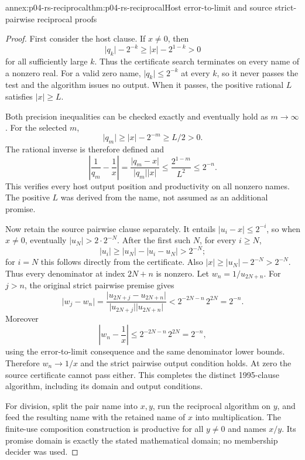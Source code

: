\begin{annexitem}{annex:p04-rs-reciprocal}{thm:p04-rs-reciprocal}{Host error-to-limit and source strict-pairwise reciprocal proofs}
\begin{proof}
First consider the host clause. If \(x\ne0\), then
\[
 \lvert q_k\rvert-2^{-k}
 \geq\lvert x\rvert-2^{1-k}>0
\]
for all sufficiently large \(k\). Thus the certificate search
terminates on every name of a nonzero real.
For a valid zero name,
\(\lvert q_k\rvert\leq2^{-k}\) at every \(k\), so it never
passes the test and the algorithm issues no output.
When it passes, the positive rational \(L\) satisfies
\(\lvert x\rvert\geq L\).

Both precision inequalities can be checked exactly and
eventually hold as \(m\to\infty\).
For the selected \(m\),
\[
 \lvert q_m\rvert
 \geq\lvert x\rvert-2^{-m}\geq L/2>0.
\]
The rational inverse is therefore defined and
\[
 \left|\frac1{q_m}-\frac1x\right|
 =\frac{\lvert q_m-x\rvert}{\lvert q_m\rvert\lvert x\rvert}
 \leq\frac{2^{1-m}}{L^2}\leq2^{-n}.
\]
This verifies every host output position and productivity
on all nonzero names. The positive \(L\) was derived from
the name, not assumed as an additional promise.

Now retain the source pairwise clause separately.
It entails \(\lvert u_i-x\rvert\leq2^{-i}\), so when
\(x\ne0\), eventually
\(\lvert u_N\rvert>2\cdot2^{-N}\).
After the first such \(N\), for every \(i\geq N\),
\[
 \lvert u_i\rvert
 \geq\lvert u_N\rvert-\lvert u_i-u_N\rvert>2^{-N};
\]
for \(i=N\) this follows directly from the certificate.
Also \(\lvert x\rvert
\geq\lvert u_N\rvert-2^{-N}>2^{-N}\).
Thus every denominator at index \(2N+n\) is nonzero.
Let \(w_n=1/u_{2N+n}\).
For \(j>n\), the original strict pairwise premise gives
\[
 \lvert w_j-w_n\rvert
 =\frac{\lvert u_{2N+j}-u_{2N+n}\rvert}
        {\lvert u_{2N+j}\rvert\lvert u_{2N+n}\rvert}
 <2^{-2N-n}\,2^{2N}=2^{-n}.
\]
Moreover
\[
 \left|w_n-\frac1x\right|
 \leq 2^{-2N-n}\,2^{2N}=2^{-n},
\]
using the error-to-limit consequence and the same denominator
lower bounds. Therefore \(w_n\to1/x\) and the strict pairwise
output condition holds. At zero the source certificate cannot
pass either. This completes the distinct 1995-clause algorithm,
including its domain and output conditions.

For division, split the pair name into \(x,y\), run the
reciprocal algorithm on \(y\), and feed the resulting name
with the retained name of \(x\) into multiplication.
The finite-use composition construction is productive for
all \(y\ne0\) and names \(x/y\). Its promise domain is exactly
the stated mathematical domain; no membership decider was
used.
\end{proof}
\end{annexitem}

